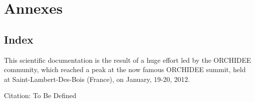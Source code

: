 

\part{Annexes}

\chapter{Index}
\label{chap:index}

\printindex

\newpage
\clearemptydoublepage



\setcounter{chapter}{17}
\label{chap:biblio}

\clearemptydoublepage

This scientific documentation is the result of a huge effort led by the ORCHIDEE community,
which reached a peak at the now famous ORCHIDEE summit, held at Saint-Lambert-Des-Bois (France), on 
January, 19-20, 2012.

Citation: To Be Defined

